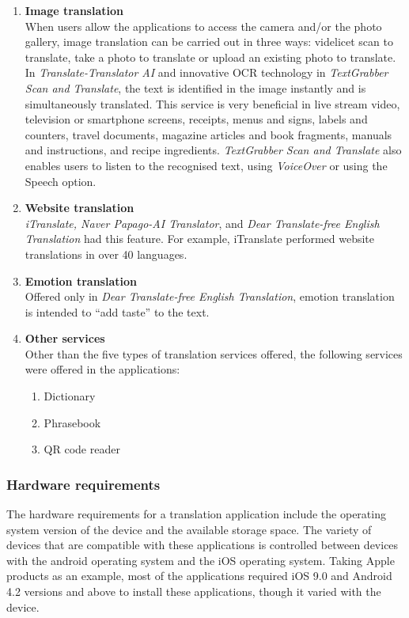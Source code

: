 \documentclass[english]{textolivre}
\begin{document}
\begin{enumerate}
    \item \textbf{Image translation} \\
    When users allow the applications to access the camera and/or the photo gallery, image translation can be carried out in three ways: videlicet scan to translate, take a photo to translate or upload an existing photo to translate. In \textit{Translate-Translator AI} and innovative OCR technology in \textit{TextGrabber Scan and Translate}, the text is identified in the image instantly and is simultaneously translated. This service is very beneficial in live stream video, television or smartphone screens, receipts, menus and signs, labels and counters, travel documents, magazine articles and book fragments, manuals and instructions, and recipe ingredients. \textit{TextGrabber Scan and Translate} also enables users to listen to the recognised text, using \textit{VoiceOver} or using the Speech option.
    \item \textbf{Website translation} \\
  \textit{  iTranslate, Naver Papago-AI Translator}, and \textit{Dear Translate-free English Translation} had this feature. For example, iTranslate performed website translations in over 40 languages.
    \item \textbf{Emotion translation} \\
    Offered only in \textit{Dear Translate-free English Translation}, emotion translation is intended to “add taste” to the text.
    \item \textbf{Other services} \\
    Other than the five types of translation services offered, the following services were offered in the applications:
    \begin{enumerate}[label=\alph*.]
        \item Dictionary
        \item Phrasebook
        \item QR code reader
    \end{enumerate}
\end{enumerate}

\subsubsection{Hardware requirements}\label{sec-equacao}
The hardware requirements for a translation application include the operating system version of the device and the available storage space. The variety of devices that are compatible with these applications is controlled between devices with the android operating system and the iOS operating system. Taking Apple products as an example, most of the applications required iOS 9.0 and Android 4.2 versions and above to install these applications, though it varied with the device.
\end{document}
